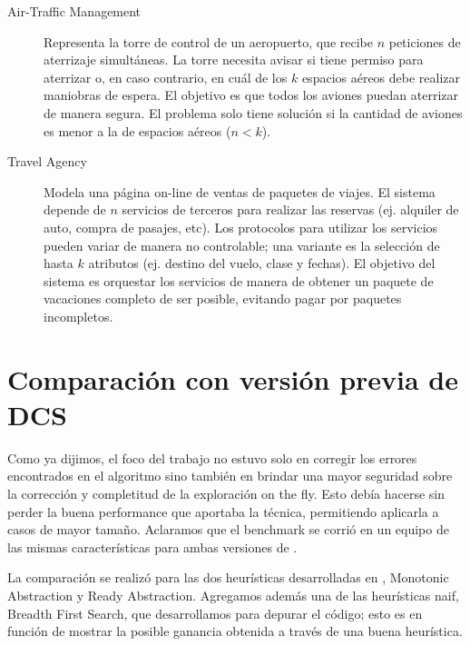 \begin{description}
    \item [Air-Traffic Management] Representa la torre de control de un aeropuerto, que recibe $n$ peticiones de aterrizaje simultáneas. La torre necesita avisar si tiene permiso para aterrizar o, en caso contrario, en cuál de los $k$ espacios aéreos debe realizar maniobras de espera. El objetivo es que todos los aviones puedan aterrizar de manera segura. El problema solo tiene solución si la cantidad de aviones es menor a la de espacios aéreos ($n<k$).
    
    \item [Travel Agency] Modela una página on-line de ventas de paquetes de viajes. El sistema depende de $n$ servicios de terceros para realizar las reservas (ej. alquiler de auto, compra de pasajes, etc). Los protocolos para utilizar los servicios pueden variar de manera no controlable; una variante es la selección de hasta $k$ atributos (ej. destino del vuelo, clase y fechas). El objetivo del sistema es orquestar los servicios de manera de obtener un paquete de vacaciones completo de ser posible, evitando pagar por paquetes incompletos.
\end{description}

\section{Comparación con versión previa de DCS}
Como ya dijimos, el foco del trabajo no estuvo solo en corregir los errores encontrados en el algoritmo sino también en brindar una mayor seguridad sobre la corrección y completitud de la exploración on the fly. Esto debía hacerse sin perder la buena performance que aportaba la técnica, permitiendo aplicarla a casos de mayor tamaño. Aclaramos que el benchmark se corrió en un equipo de las mismas características para ambas versiones de \DCS.

La comparación se realizó para las dos heurísticas desarrolladas en \cite{tesisDani}, Monotonic Abstraction y Ready Abstraction. Agregamos además una de las heurísticas naif, Breadth First Search, que desarrollamos para depurar el código; esto es en función de mostrar la posible ganancia obtenida a través de una buena heurística.


